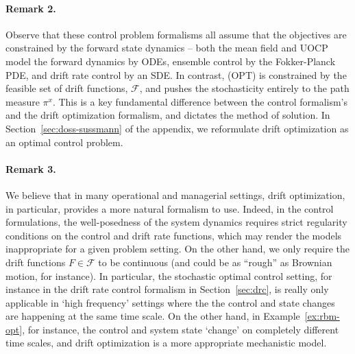 \documentclass[11pt,leqno]{amsart}
\begin{document}
\paragraph{Remark 2.} Observe that these control problem formalisms all assume that the objectives are constrained by the forward state dynamics --  both the mean field and UOCP model the forward dynamics by ODEs, ensemble control by the Fokker-Planck PDE, and drift rate control by an SDE. In contrast, (OPT) is constrained by the feasible set of drift functions, $\mathcal F$, and pushes the stochasticity entirely to the path measure $\pi^x$. This is a key fundamental difference between the control formalism's and the drift optimization formalism, and dictates the method of solution. In Section~\ref{sec:doss-sussmann} of the appendix, we reformulate drift optimization as an optimal control problem. 

\paragraph{Remark 3.} We believe that in many operational and managerial settings, drift optimization, in particular, provides a more natural formalism to use. Indeed, in the control formulations, the well-posedness of the system dynamics requires strict regularity conditions on the control and drift rate functions, which may render the models inappropriate for a given problem setting. On the other hand, we only require the drift functions $F \in \mathcal F$ to be continuous (and could be as ``rough'' as Brownian motion, for instance). In particular, the stochastic optimal control setting, for instance in the drift rate control formalism in Section~\ref{sec:drc}, is really only applicable in `high frequency' settings where the the control and state changes are happening at the same time scale. On the other hand, in Example~\ref{ex:rbm-opt}, for instance, the control and system state `change' on completely different time scales, and drift optimization is a more appropriate mechanistic model.  %
\end{document}
